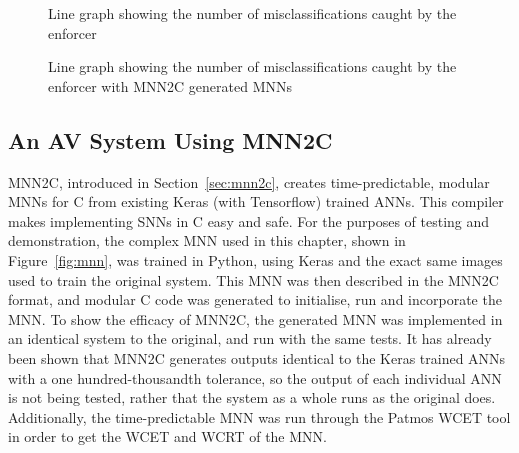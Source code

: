 
\begin{figure}[t]
	\centering
	\scalebox{0.9}{}
	\caption{Line graph showing the number of misclassifications caught by the enforcer \label{fig:sign-graphboth}}
\end{figure}

\begin{figure}[t]
	\centering
	\scalebox{0.9}{}
	\caption{Line graph showing the number of misclassifications caught by the enforcer with \ac{MNN2C} generated \acp{MNN} \label{fig:sign-graphboth-mnn2c}}
\end{figure}


\subsection{An \ac{AV} System Using \acf{MNN2C}}
\ac{MNN2C}, introduced in Section~\ref{sec:mnn2c}, creates time-predictable, modular \acfp{MNN} for C from existing Keras (with Tensorflow) trained \acp{ANN}. 
This compiler makes implementing \acfp{SNN} in C easy and safe.
For the purposes of testing and demonstration, the complex \ac{MNN} used in this chapter, shown in Figure~\ref{fig:mnn}, was trained in Python, using Keras and the exact same images used to train the original system.
This \ac{MNN} was then described in the \ac{MNN2C} format, and modular C code was generated to initialise, run and incorporate the \ac{MNN}.
To show the efficacy of \ac{MNN2C}, the generated \ac{MNN} was implemented in an identical system to the original, and run with the same tests. 
It has already been shown that \ac{MNN2C} generates outputs identical to the Keras trained \acp{ANN} with a one hundred-thousandth tolerance, so the output of each individual \ac{ANN} is not being tested, rather that the system as a whole runs as the original does.
Additionally, the time-predictable \ac{MNN} was run through the Patmos \ac{WCET} tool in order to get the \ac{WCET} and \ac{WCRT} of the \ac{MNN}.

